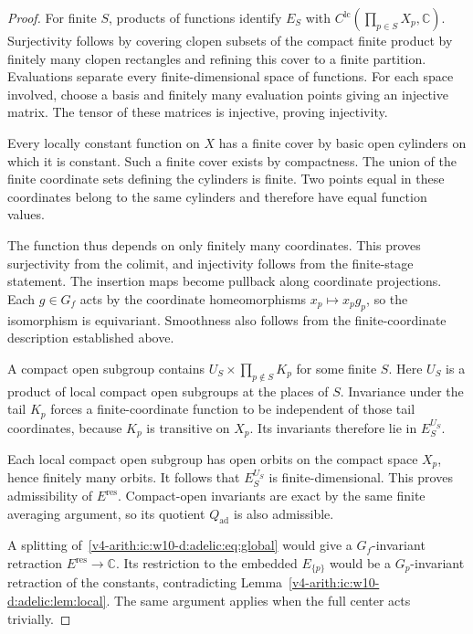 \begin{proof}
For finite $S$, products of functions identify $E_S$ with
$C^{\mathrm{lc}}(\prod_{p\in S}X_p,\mathbb C)$. Surjectivity follows by covering
clopen subsets of the compact finite product by finitely many clopen
rectangles and refining this cover to a finite partition. Evaluations separate every finite-dimensional space of functions.
For each space involved, choose a basis and finitely many
evaluation points giving an injective matrix.
The tensor of these matrices is injective, proving injectivity.

Every locally constant function on $X$ has a finite cover by basic open
cylinders on which it is constant. Such a finite cover exists by
compactness. The union of the finite coordinate sets defining the
cylinders is finite. Two points equal in these coordinates belong to
the same cylinders and therefore have equal function values.

The function
thus depends on only finitely many coordinates. This proves surjectivity
from the colimit, and injectivity follows from the finite-stage statement.
The insertion maps become pullback along coordinate projections.
Each $g\in G_f$ acts by the coordinate homeomorphisms $x_p\mapsto x_pg_p$,
so the isomorphism is equivariant. Smoothness also follows from the
finite-coordinate description established above.

A compact open subgroup contains $U_S\times\prod_{p\notin S}K_p$
for some finite $S$. Here $U_S$ is a product of local compact
open subgroups at the places of $S$. Invariance under
the tail $K_p$ forces a finite-coordinate function to be independent of
those tail coordinates, because $K_p$ is transitive on $X_p$.
Its invariants therefore lie in $E_S^{U_S}$.

Each local compact open
subgroup has open orbits on the compact space $X_p$, hence finitely many
orbits. It follows that $E_S^{U_S}$ is finite-dimensional.
This proves admissibility of $E^{\mathrm{res}}$. Compact-open invariants
are exact by the same finite averaging argument, so its quotient $Q_{\mathrm{ad}}$
is also admissible.

A splitting of~\eqref{v4-arith:ic:w10-d:adelic:eq:global} would give a $G_f$-invariant retraction
$E^{\mathrm{res}}\to\mathbb C$. Its restriction to the embedded $E_{\{p\}}$
would be a $G_p$-invariant retraction of the constants, contradicting
Lemma~\ref{v4-arith:ic:w10-d:adelic:lem:local}. The same argument applies when the full center
acts trivially.
\end{proof}

